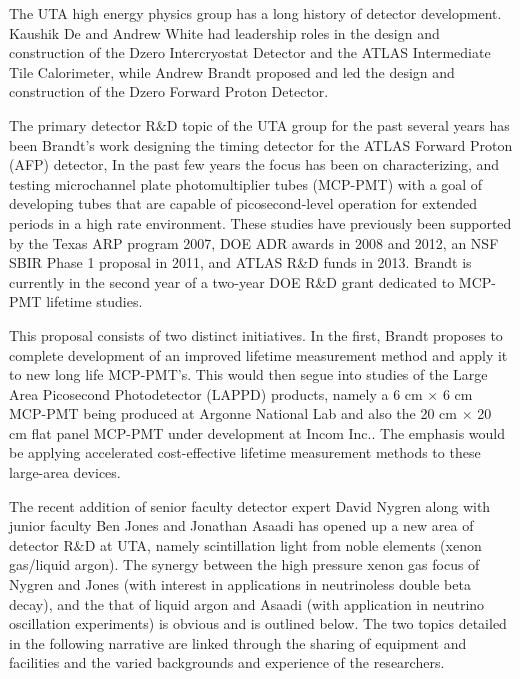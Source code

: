 The UTA high energy physics group has a long history of detector development. Kaushik De and Andrew White had leadership roles in the design and construction of the Dzero Intercryostat Detector  and the ATLAS Intermediate Tile Calorimeter,  while Andrew Brandt proposed and led the design and construction of the Dzero Forward Proton Detector.

The primary detector R$\&$D topic of the UTA group for the past several years has been Brandt’s work designing the timing detector for the ATLAS Forward Proton (AFP) detector, In the past few years the focus has been on characterizing, and testing microchannel plate photomultiplier tubes (MCP-PMT) with a goal of developing tubes that are capable of picosecond-level operation for extended periods in a high rate environment. These studies have previously been supported by the Texas ARP program 2007, DOE ADR awards in 2008 and 2012, an NSF SBIR Phase 1 proposal in 2011, and ATLAS R\&D funds in 2013. Brandt is currently in the second year of a two-year DOE R\&D grant dedicated to MCP-PMT lifetime studies.  

This proposal consists of two distinct initiatives. In the first, Brandt proposes to complete development of an improved lifetime measurement method and apply it to new long life MCP-PMT’s. This would then segue into studies of the Large Area Picosecond Photodetector (LAPPD)\cite{LAPPD} products, namely a  6 cm $\times$ 6 cm MCP-PMT being produced at Argonne National Lab and also the 20 cm $\times$ 20 cm flat panel MCP-PMT under development at Incom Inc.\cite{incom}. The emphasis would be applying accelerated cost-effective lifetime measurement methods to these large-area devices.

The recent addition of senior faculty detector expert David Nygren along with junior faculty Ben Jones and Jonathan Asaadi has opened up a new area of detector R$\&$D at UTA, namely scintillation light from noble elements (xenon gas/liquid argon). The synergy between the high pressure xenon gas focus of Nygren and Jones (with interest in applications in neutrinoless double beta decay), and the that of liquid argon and Asaadi (with application in neutrino oscillation experiments) is obvious and is outlined below.  The two topics detailed in the following narrative are linked through the sharing of equipment and facilities and the varied backgrounds and experience of the researchers.